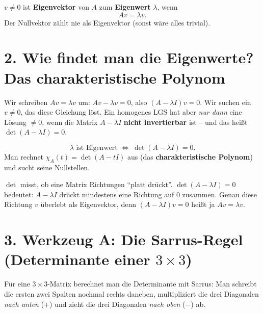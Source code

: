 \documentclass[a4paper,12pt]{article}
\begin{document}
\begin{merkbox}
$v \neq 0$ ist \textbf{Eigenvektor} von $A$ zum \textbf{Eigenwert} $\lambda$, wenn
\[
A v = \lambda v.
\]
Der Nullvektor z\"ahlt nie als Eigenvektor (sonst w\"are alles trivial).
\end{merkbox}

\section*{2. Wie findet man die Eigenwerte? Das charakteristische Polynom}

Wir schreiben $Av = \lambda v$ um: $Av - \lambda v = 0$, also $(A - \lambda I)v = 0$. Wir suchen ein $v \neq 0$, das diese Gleichung l\"ost. Ein homogenes LGS hat aber \emph{nur dann} eine L\"osung $\neq 0$, wenn die Matrix $A - \lambda I$ \textbf{nicht invertierbar} ist -- und das hei\ss t $\det(A - \lambda I) = 0$.

\begin{merkbox}[title={Der Schl\"ussel}]
\[
\lambda \text{ ist Eigenwert} \;\Longleftrightarrow\; \det(A - \lambda I) = 0.
\]
Man rechnet $\chi_A(t) = \det(A - tI)$ aus (das \textbf{charakteristische Polynom}) und sucht seine Nullstellen.
\end{merkbox}

\begin{analogie}
$\det$ misst, ob eine Matrix Richtungen ``platt dr\"uckt''. $\det(A - \lambda I) = 0$ bedeutet: $A - \lambda I$ dr\"uckt mindestens eine Richtung auf $0$ zusammen. Genau diese Richtung $v$ \"uberlebt als Eigenvektor, denn $(A - \lambda I)v = 0$ hei\ss t ja $Av = \lambda v$.
\end{analogie}

\section*{3. Werkzeug A: Die Sarrus-Regel (Determinante einer $3\times3$)}

F\"ur eine $3\times3$-Matrix berechnet man die Determinante mit Sarrus: Man schreibt die ersten zwei Spalten nochmal rechts daneben, multipliziert die drei Diagonalen \emph{nach unten} ($+$) und zieht die drei Diagonalen \emph{nach oben} ($-$) ab.

\begin{center}
\end{center}
\end{document}

